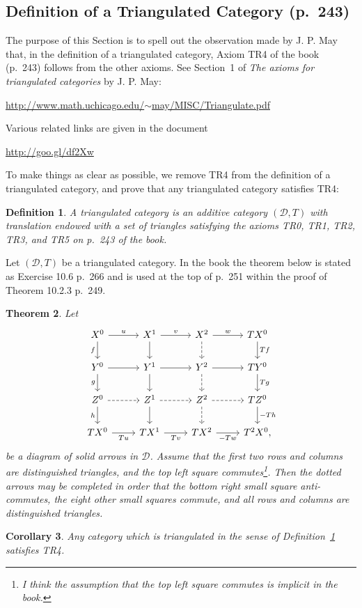 \documentclass[12pt]{article}
\newtheorem{thm}{Theorem}
\newtheorem{cor}[thm]{Corollary}
\newtheorem{df}[thm]{Definition}%
\theoremstyle{remark}
\theoremstyle{definition}
\newcommand{\cc}{\mathcal}
\begin{document}
\subsection{Definition of a Triangulated Category (p.~243)} %
%
The purpose of this Section is to spell out the observation made by J. P. May that, in the definition of a triangulated category, Axiom TR4 of the book (p.~243) follows from the other axioms. See Section~1 of {\em The axioms for triangulated categories} by J. P. May:%
%
\begin{center}\href{http://www.math.uchicago.edu/~may/MISC/Triangulate.pdf}{http://www.math.uchicago.edu/$\sim$may/MISC/Triangulate.pdf}%
\end{center}
%
Various related links are given in the document%
%
\begin{center}\href{http://goo.gl/df2Xw}{http://goo.gl/df2Xw}%
\end{center}

To make things as clear as possible, we remove TR4 from the definition of a triangulated category, and prove that any triangulated category satisfies TR4:
%
\begin{df}\label{tr}
A {\em triangulated category} is an additive category $(\cc D,T)$ with translation endowed with a set of triangles satisfying the axioms {\em TR0, TR1, TR2, TR3}, and {\em TR5} on p.~243 of the book.
\end{df}
%
Let $(\cc D,T)$ be a triangulated category. In the book the theorem below is stated as Exercise 10.6 p.~266 and is used at the top of p.~251 within the proof of Theorem 10.2.3 p.~249.
%
\begin{thm}\label{mayt}
Let 
$$
\begin{tikzcd}
X^0\ar{r}{u}\ar{d}[swap]{f}&X^1\ar{d}\ar{r}{v}&X^2\ar[dashed]{d}\ar{r}{w}&TX^0\ar{d}{Tf}\\ 
Y^0\ar{r}\ar{d}[swap]{g}&Y^1\ar{d}\ar{r}&Y^2\ar[dashed]{d}\ar{r}&TY^0\ar{d}{Tg}\\ 
Z^0\ar[dashed]{r}\ar{d}[swap]{h}&Z^1\ar{d}\ar[dashed]{r}&Z^2\ar[dashed]{d}\ar[dashed]{r}&TZ^0\ar{d}{-Th}\\ 
TX^0\ar{r}[swap]{Tu}&TX^1\ar{r}[swap]{Tv}&TX^2\ar{r}[swap]{-Tw}&T^2X^0,
\end{tikzcd}
$$ 
be a diagram of solid arrows in $\cc D$. Assume that the first two rows and columns are distinguished triangles, and the top left square commutes\footnote{I think the assumption that the top left square commutes is implicit in the book.}. Then the dotted arrows may be completed in order that the bottom right small square anti-commutes, the eight other small squares commute, and all rows and columns are distinguished triangles. 
\end{thm}
%
\begin{cor}\label{may}
Any category which is triangulated in the sense of Definition~\ref{tr} satisfies {\em TR4}.
\end{cor} 
\end{document}
